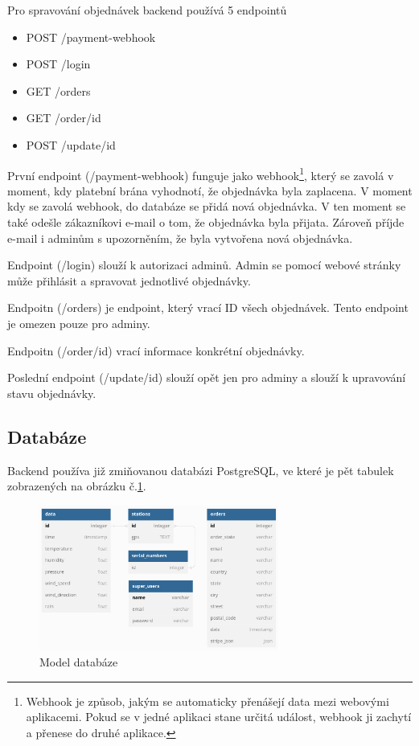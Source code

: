 Pro spravování objednávek backend používá 5 endpointů
\begin{itemize}
  \item POST /payment-webhook
  \item POST /login
  \item GET /orders
  \item GET /order/{id}
  \item POST /update/{id}
\end{itemize}
První endpoint (/payment-webhook) funguje jako webhook\footnote{Webhook je způsob, jakým se automaticky přenášejí data mezi webovými aplikacemi.
Pokud se v jedné aplikaci stane určitá událost, webhook ji zachytí a přenese do druhé aplikace.},
který se zavolá v moment, kdy platební brána vyhodnotí, že objednávka byla zaplacena. V moment kdy se zavolá webhook, do databáze se přidá nová objednávka. 
V ten moment se také odešle zákazníkovi e-mail o tom, že objednávka byla přijata. Zároveň příjde e-mail i adminům s upozorněním, že byla vytvořena nová objednávka.

Endpoint (/login) slouží k autorizaci adminů. Admin se pomocí webové stránky může přihlásit a spravovat jednotlivé objednávky.

Endpoitn (/orders) je endpoint, který vrací ID všech objednávek. Tento endpoint je omezen pouze pro adminy.

Endpoitn (/order/{id}) vrací informace konkrétní objednávky.

Poslední endpoint (/update/{id}) slouží opět jen pro adminy a slouží k upravování stavu objednávky.

\subsection{Databáze}
Backend používa již zmiňovanou databázi PostgreSQL, ve které je pět tabulek zobrazených na obrázku č.\ref{model_databaze}.
\begin{figure}[h] 
    \centering
    \includegraphics[width=0.7\textwidth]{images/database_diagram.png}
    \caption{Model databáze}
    \label{model_databaze}
\end{figure}
